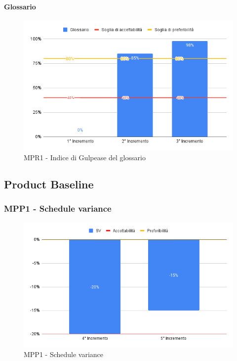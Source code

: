 \paragraph{Glossario} \aCapo{}

\begin{figure}[H]
	\centering
	\includegraphics[scale = 0.6]{sezioni/Images/Glossario.png}
	\caption{MPR1 - Indice di Gulpease del glossario}
\end{figure}

\subsection{Product Baseline}
\subsubsection{MPP1 - Schedule variance}

\begin{figure}[H]
	\centering
	\includegraphics[scale = 0.6]{sezioni/Images/PB/SV.png}
	\caption{MPP1 - Schedule variance}
\end{figure}

